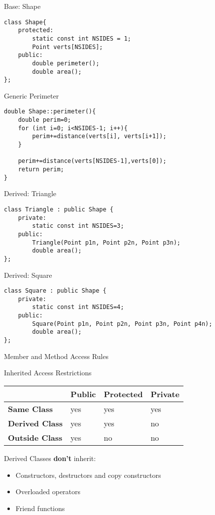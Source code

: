 \documentclass[xcolor={dvipsnames}]{beamer}
\begin{document}
\begin{frame}[fragile]{Base: Shape}
\begin{verbatim}
class Shape{
    protected:
        static const int NSIDES = 1;
        Point verts[NSIDES];
    public:
        double perimeter();
        double area();
};
\end{verbatim}
\end{frame}

\begin{frame}[fragile]{Generic Perimeter}
\begin{verbatim}
double Shape::perimeter(){
    double perim=0;
    for (int i=0; i<NSIDES-1; i++){
        perim+=distance(verts[i], verts[i+1]);
    }
        
    perim+=distance(verts[NSIDES-1],verts[0]);
    return perim;
}
\end{verbatim}
\end{frame}

\begin{frame}[fragile]{Derived: Triangle}
\begin{verbatim}
class Triangle : public Shape {
    private:
        static const int NSIDES=3;
    public:
        Triangle(Point p1n, Point p2n, Point p3n);
        double area();
};
\end{verbatim}
\end{frame}

\begin{frame}[fragile]{Derived: Square}
\begin{verbatim}
class Square : public Shape {
    private:
        static const int NSIDES=4;
    public:
        Square(Point p1n, Point p2n, Point p3n, Point p4n);
        double area();
};
\end{verbatim}
\end{frame}

\begin{frame}{Member and Method Access Rules}
	\begin{block}{Inherited Access Restrictions}
	\begin{center}
	\begin{tabular}{l|l|l|l}
		  & \textbf{Public} & \textbf{Protected} & \textbf{Private}\\\hline
		\textbf{Same Class} & yes & yes & yes\\
		\textbf{Derived Class} & yes & yes & no\\
		\textbf{Outside Class} & yes & no & no\\
	\end{tabular}
	\end{center}
	\end{block}
\pause
\begin{block}{Derived Classes \textbf{don't} inherit:}
	\begin{itemize}
		\item Constructors, destructors and copy constructors
		\item Overloaded operators
		\item Friend functions
	\end{itemize}
\end{block}
\end{frame}
\end{document}
